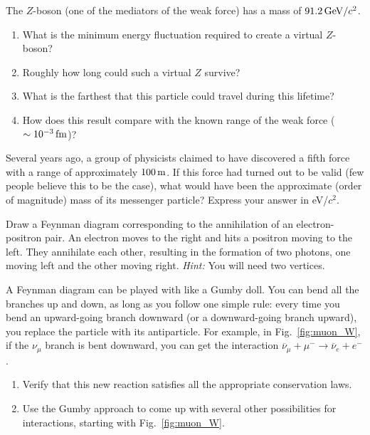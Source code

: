 \begin{problem} 
The $Z$-boson (one of the mediators of the weak force) has a
  mass of $91.2\,\mbox{GeV/$c^2$}$.
  \begin{enumerate}
  \item What is the minimum energy fluctuation required to create a
    virtual $Z$-boson?
  \item Roughly how long could such a virtual $Z$ survive?
  \item What is the farthest that this particle could travel during
    this lifetime?
  \item How does this result compare with the known range of the weak
    force ($\sim 10^{-3}\,\mbox{fm}$)?
  \end{enumerate}
\label{prob:Z_boson}
\end{problem}

\begin{problem}
Several years ago, a group of physicists claimed to have
discovered a fifth force with a range of approximately $100\,\mbox{m}$.  
If this force had turned out to be valid (few people
believe this to be the case), what would have been the approximate
(order of magnitude) mass of its messenger particle?  Express your
answer in eV/$c^2$.  
\label{prob:fifth_force}
\end{problem}

\begin{problem}
Draw a Feynman diagram corresponding to the annihilation of
an
  electron-positron pair.  An electron moves to the right and hits a
  positron moving to the left.  They annihilate each other, resulting
  in the formation of two photons, one moving left and the other
  moving right.  {\em Hint:} You will need two vertices.
\label{prob:pair_annihilation_diagram}
\end{problem}

\begin{problem}
A Feynman diagram can be played with like a Gumby doll.  You
can bend all the branches up and down, as long as you follow one simple
rule: every time you bend an upward-going branch downward (or a
downward-going branch upward), you replace the particle with its
antiparticle.  For example, in Fig.~\ref{fig:muon_W}, if the
$\nu_\mu$ branch is bent downward, you can get the interaction
$\overline\nu_\mu + \mu^- \to \overline\nu_e + e^-$.
  \begin{enumerate}
  \item Verify that this new reaction satisfies all the appropriate
    conservation laws.
  \item Use the Gumby approach to come up with several other
    possibilities for interactions, starting with Fig.~\ref{fig:muon_W}.
  \end{enumerate}
\label{prob:gumby}
\end{problem}

